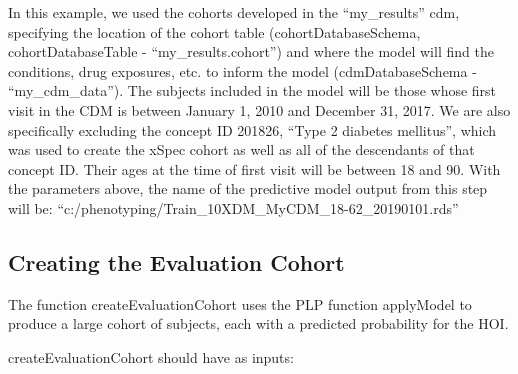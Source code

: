 \documentclass[
]{article}
\begin{document}
In this example, we used the cohorts developed in the ``my\_results''
cdm, specifying the location of the cohort table (cohortDatabaseSchema,
cohortDatabaseTable - ``my\_results.cohort'') and where the model will
find the conditions, drug exposures, etc. to inform the model
(cdmDatabaseSchema - ``my\_cdm\_data''). The subjects included in the
model will be those whose first visit in the CDM is between January 1,
2010 and December 31, 2017. We are also specifically excluding the
concept ID 201826, ``Type 2 diabetes mellitus'', which was used to
create the xSpec cohort as well as all of the descendants of that
concept ID. Their ages at the time of first visit will be between 18 and
90. With the parameters above, the name of the predictive model output
from this step will be:
``c:/phenotyping/Train\_10XDM\_MyCDM\_18-62\_20190101.rds''

\hypertarget{creating-the-evaluation-cohort}{%
\subsection{Creating the Evaluation
Cohort}\label{creating-the-evaluation-cohort}}

The function createEvaluationCohort uses the PLP function applyModel to
produce a large cohort of subjects, each with a predicted probability
for the HOI.

createEvaluationCohort should have as inputs:
\end{document}
